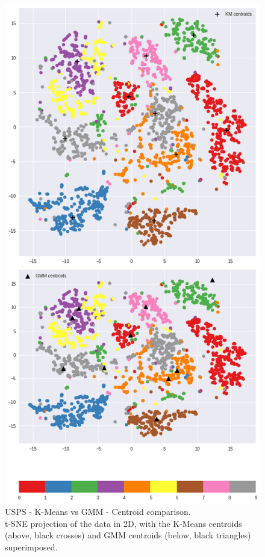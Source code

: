 \documentclass[a4paper,11pt]{article}
\begin{document}
\begin{figure}
    \centering
    \includegraphics[scale=0.5]{../images/assignment9_2.png}
    \caption{\small{USPS - K-Means vs GMM - Centroid comparison.
             \\ t-SNE projection of the data in 2D, with the K-Means centroids (above, black crosses) and GMM centroids (below, black triangles) superimposed.}}
    \label{fig:assignment9_1}
\end{figure}
\end{document}
